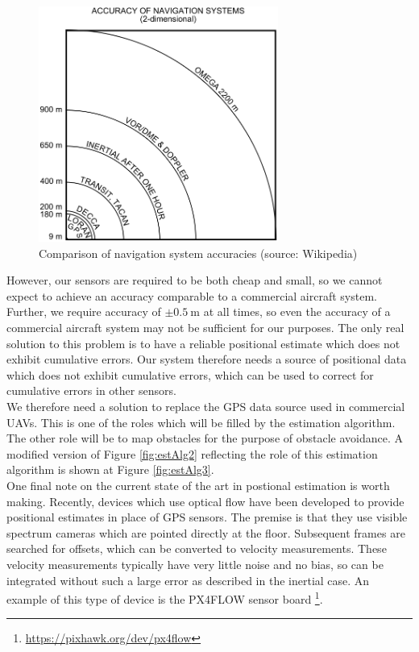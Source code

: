 \documentclass[capstone_report.tex]{subfiles}
\begin{document}
\begin{figure}[H]
    \centering
    \includegraphics[width=0.7\textwidth]{imgs/inertialAcc.png}
    \caption{Comparison of navigation system accuracies (source: Wikipedia)\label{fig:inAcc}}
\end{figure}

However, our sensors are required to be both cheap and small, so we cannot expect to achieve an accuracy comparable to a commercial aircraft system. Further, we require accuracy of $\pm \SI{0.5}{\meter}$ at all times, so even the accuracy of a commercial aircraft system may not be sufficient for our purposes. The only real solution to this problem is to have a reliable positional estimate which does not exhibit cumulative errors. Our system therefore needs a source of positional data which does not exhibit cumulative errors, which can be used to correct for cumulative errors in other sensors. \\

We therefore need a solution to replace the GPS data source used in commercial UAVs. This is one of the roles which will be filled by the estimation algorithm. The other role will be to map obstacles for the purpose of obstacle avoidance. A modified version of Figure \ref{fig:estAlg2} reflecting the role of this estimation algorithm is shown at Figure \ref{fig:estAlg3}.\\

One final note on the current state of the art in postional estimation is worth making. Recently, devices which use optical flow have been developed to provide positional estimates in place of GPS sensors. The premise is that they use visible spectrum cameras which are pointed directly at the floor. Subsequent frames are searched for offsets, which can be converted to velocity measurements. These velocity measurements typically have very little noise and no bias, so can be integrated without such a large error as described in the inertial case. An example of this type of device is the PX4FLOW sensor board \footnote{\url{https://pixhawk.org/dev/px4flow}}. \\
\end{document}
